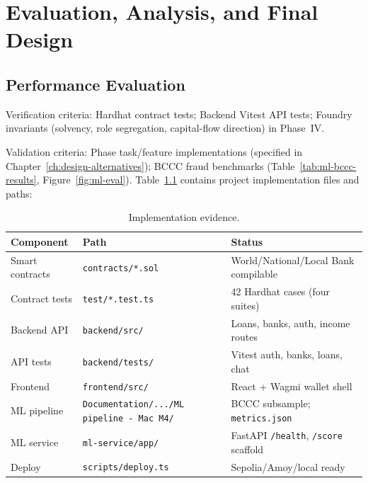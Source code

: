 \documentclass[12pt,a4paper]{report}
\newcommand{\tableheadcolor}{\rowcolor{TableHeadBg}}
\begin{document}
\chapter{Evaluation, Analysis, and Final Design}
\label{ch:evaluation}
\label{ch:market-analysis}

\section{Performance Evaluation}
\label{sec:performance-evaluation}
\label{sec:eval-method}
\label{sec:verification-validation}
\label{sec:foundry}

Verification criteria: Hardhat contract tests; Backend Vitest API tests; Foundry invariants (solvency, role segregation, capital-flow direction) in Phase~IV.

Validation criteria: Phase task/feature implementations (specified in Chapter~\ref{ch:design-alternatives}); BCCC fraud benchmarks (Table~\ref{tab:ml-bccc-results}, Figure~\ref{fig:ml-eval}). Table~\ref{tab:implementation-evidence} contains project implementation files and paths:

\label{sec:implementation-evidence}

\begin{table}[H]
\centering
\caption[Implementation evidence]{Implementation evidence.}
\label{tab:implementation-evidence}
\small
\begin{tabular}{@{}p{3.2cm}p{4.4cm}p{6.6cm}@{}}
\toprule
\tableheadcolor
\textbf{Component} & \textbf{Path} & \textbf{Status} \\
\midrule
Smart contracts & \texttt{contracts/*.sol} & World/National/Local Bank compilable \\
Contract tests & \texttt{test/*.test.ts} & 42 Hardhat cases (four suites) \\
Backend API & \texttt{backend/src/} & Loans, banks, auth, income routes \\
API tests & \texttt{backend/tests/} & Vitest auth, banks, loans, chat \\
Frontend & \texttt{frontend/src/} & React + Wagmi wallet shell \\
ML pipeline & \texttt{Documentation/.../ML pipeline - Mac M4/} & BCCC subsample; \texttt{metrics.json} \\
ML service & \texttt{ml-service/app/} & FastAPI \texttt{/health}, \texttt{/score} scaffold \\
Deploy & \texttt{scripts/deploy.ts} & Sepolia/Amoy/local ready \\
\bottomrule
\end{tabular}
\end{table}
\end{document}
